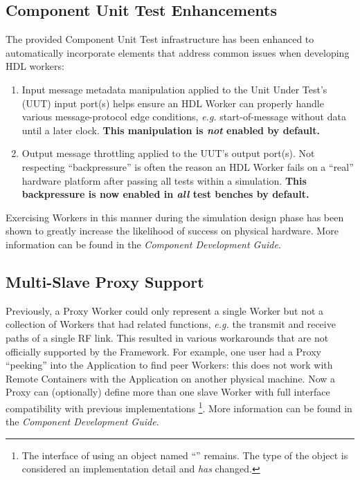 \subsection{Component Unit Test Enhancements} %
\label{sec:14_test}
The provided Component Unit Test infrastructure has been enhanced to automatically incorporate elements that address common issues when developing HDL workers:
\begin{enumerate}
\setlength\itemsep{0em} %
\item Input message metadata manipulation applied to the Unit Under Test's (UUT) input port(s) helps ensure an HDL Worker can properly handle various message-protocol edge conditions, \textit{e.g.} start-of-message without data until a later clock. \textbf{This manipulation is \textit{not} enabled by default.}
\item Output message throttling applied to the UUT's output port(s). Not respecting ``backpressure'' is often the reason an HDL Worker fails on a ``real'' hardware platform after passing all tests within a simulation. \textbf{This backpressure is now enabled in \textit{all} test benches by default.}
\end{enumerate}
Exercising Workers in this manner during the simulation design phase has been shown to greatly increase the likelihood of success on physical hardware. More information can be found in the \textit{Component Development Guide}.

\subsection{Multi-Slave Proxy Support} %
\label{sec:14_multislave}
Previously, a Proxy Worker could only represent a single Worker but not a collection of Workers that had related functions, \textit{e.g.} the transmit and receive paths of a single RF link. This resulted in various workarounds that are not officially supported by the Framework. For example, one user had a Proxy ``peeking'' into the Application to find peer Workers: this does not work with Remote Containers with the Application on another physical machine. Now a Proxy can (optionally) define more than one slave Worker with full interface compatibility with previous implementations \footnote{The interface of using an object named ``'' remains. The type of the object is considered an implementation detail and \textit{has} changed.}. More information can be found in the \textit{Component Development Guide}.

